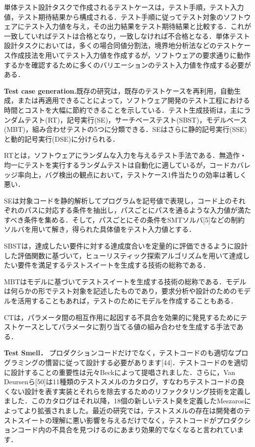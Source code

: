 \documentclass[conference]{IEEEtran}
\begin{document}
単体テスト設計タスクで作成されるテストケースは，テスト手順，テスト入力値，テスト期待結果から構成される．テスト手順に従ってテスト対象のソフトウェアにテスト入力値を与え，その出力結果をテスト期待結果と比較する．これが一致していればテストは合格となり，一致しなければ不合格となる．単体テスト設計タスクにおいては，多くの場合同値分割法，境界地分析法などのテストケース作成技法を用いてテスト入力値を作成するが，ソフトウェアの要求通りに動作するかを確認するために多くのバリエーションのテスト入力値を作成する必要がある．

\textbf{Test case generation.}既存の研究\cite{b12}は，既存のテストケースを再利用，自動生成，または再適用できることによって，ソフトウェア開発のテスト工程における時間とコストを大幅に節約できることを示している．テスト生成技術は，主にランダムテスト(RT)，記号実行(SE)，サーチベーステスト(SBST)，モデルベース(MBT)，組み合わせテストの5つに分類できる．SEはさらに静的記号実行(SSE)と動的記号実行(DSE)に分けられる．

RTとは，ソフトウェアにランダムな入力を与えるテスト手法である．無造作・均一にテストを実行するランダムテストは自動化に適しているが，コードカバレッジ率向上，バグ検出の観点において，テストケース1件当たりの効率は著しく悪い．

SEは対象コードを静的解析してプログラムを記号値で表現し，コード上のそれぞれのパスに対応する条件を抽出し，パスごとにパスを通るような入力値が満たすべき条件を集める．そして，パスごとにその条件をSMTソルバ[5]などの制約ソルバを用いて解き，得られた具体値をテスト入力値とする．

SBSTは，達成したい要件に対する達成度合いを定量的に評価できるように設計した評価関数に基づいて，ヒューリスティック探索アルゴリズムを用いて達成したい要件を満足するテストスイートを生成する技術の総称である．

MBTはモデルに基づいてテストスイートを生成する技術の総称である．モデルは何らかの形でテスト対象を記述したものであり，要求分析や設計のためのモデルを活用することもあれば，テストのためにモデルを作成することもある．

CTは，パラメータ間の相互作用に起因する不具合を効果的に発見するためにテストケースとしてパラメータに割り当てる値の組み合わせを生成する手法である．


\textbf{Test Smell．}
プロダクションコードだけでなく，テストコードのも適切なプログラミングの慣習に従って設計する必要があります[44]．テストコードのを適切に設計することの重要性は元々Beck\cite{b4}によって提唱されました．さらに，Van Deursenら[50]は11種類のテストスメルのカタログ，すなわちテストコードの良くない設計を表す実装とそれらを除去するためのリファクタリング技術を定義しました．このカタログはそれ以降，18個の新しいテスト臭を定義したMeszaros\cite{b6}によってより拡張されました。最近の研究では，テストスメルの存在は開発者のテストスイートの理解に悪い影響を与えるだけでなく，テストコードがプロダクションコード内の不具合を見つけるのにあまり効果的でなくなると言われています\cite{b8}．
\end{document}
